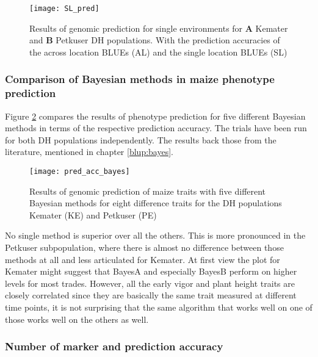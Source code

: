 \begin{figure}[H]
 \centering \texttt{[image: SL\_pred]}
 \decoRule
 \caption[Results of genomic prediction for single environments for Kemater and
 Petkuser DH populations]{Results of genomic prediction for single environments for
   \textbf{A} Kemater and \textbf{B} Petkuser DH populations. With the prediction accuracies of the across location BLUEs (AL) and the single location BLUEs (SL) }
\label{fig:sl_pred}
\end{figure}

\subsubsection{Comparison of Bayesian methods in maize phenotype prediction}

Figure \ref{fig:bayes_vs_acc} compares the results of phenotype prediction for five
different Bayesian methods in terms of the respective prediction accuracy. The trials have
been run for both DH populations independently. The results back those from the
literature, mentioned in chapter \ref{blup:bayes}.

\begin{figure}[H]
 \centering \texttt{[image: pred\_acc\_bayes]}
 \decoRule
 \caption[Results of genomic prediction of maize traits with five different Bayesian
 methods]{Results of genomic prediction of maize traits with five different Bayesian
   methods for eight difference traits for the DH populations Kemater (KE) and Petkuser
   (PE)}
\label{fig:bayes_vs_acc}
\end{figure}

No single method is superior over all the others. This is more pronounced in the Petkuser
subpopulation, where there is almost no difference between those methods at all and less
articulated for Kemater. At first view the plot for Kemater might suggest that BayesA and
especially BayesB perform on higher levels for most trades. However, all the early vigor
and plant height traits are closely correlated since they are basically the same trait
measured at different time points, it is not surprising that the same algorithm that works
well on one of those works well on the others as well.

\subsubsection{Number of marker and prediction accuracy}

